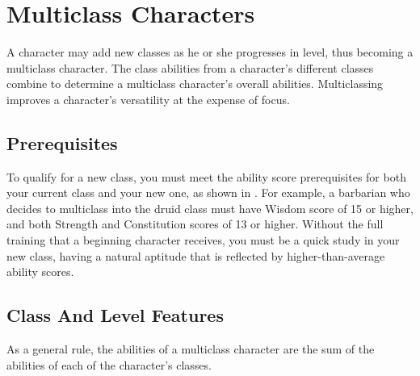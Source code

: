 \section{Multiclass Characters}
A character may add new classes as he or she progresses in level, thus becoming a multiclass character. The class abilities from a character's different classes combine to determine a multiclass character's overall abilities. Multiclassing improves a character's versatility at the expense of focus.

\subsection{Prerequisites}
To qualify for a new class, you must meet the ability score prerequisites for both your current class and your new one, as shown in . For example, a barbarian who decides to multiclass into the druid class must have Wisdom score of 15 or higher, and both Strength and Constitution scores of 13 or higher. Without the full training that a beginning character receives, you must be a quick study in your new class, having a natural aptitude that is reflected by higher-than-average ability scores.


\subsection{Class And Level Features}
As a general rule, the abilities of a multiclass character are the sum of the abilities of each of the character's classes.

